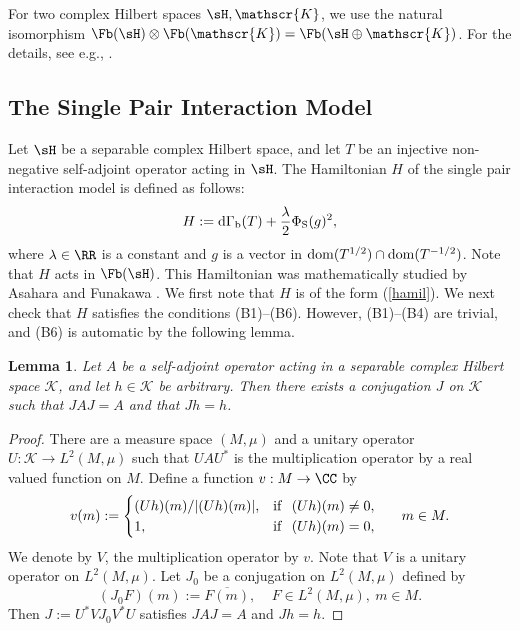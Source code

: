 \documentclass[12pt]{article}
\theoremstyle{plain}
\newtheorem{lem}[theorem]{\bf Lemma}
\numberwithin{equation}{section}
\theoremstyle{remark}
\begin{document}
For two complex Hilbert spaces $\sH,\mathscr{K}$, we use the natural isomorphism
$\Fb(\sH)\otimes\Fb(\mathscr{K})=\Fb(\sH\oplus\mathscr{K})$.
For the details, see e.g., \cite[Section 5.20]{A18}.








\subsection{The Single Pair Interaction Model}\label{pair interaction model}
Let $\sH$ be a separable complex Hilbert space, and let $T$ be an injective non-negative self-adjoint operator acting in $\sH$.
The Hamiltonian $H$ of the single pair interaction model is defined as follows:
\[
H:={\rm d}\Gamma_{\rm b}(T) + \frac{\lambda}{2}\Phi_{\rm S}(g)^2,
\] 
where $\lambda\in\RR$ is a constant and $g$ is a vector in ${\rm dom}(T^{1/2})\cap{\rm dom}(T^{-1/2})$.
Note that $H$ acts in $\Fb(\sH)$.
This Hamiltonian was mathematically studied by Asahara and Funakawa \cite{AF}.
We first note that $H$ is of the form (\ref{hamil}).
We next check that $H$ satisfies the conditions (B1)--(B6).
However, (B1)--(B4) are trivial, and (B6) is automatic by the following lemma.

\begin{lem}\label{conjugation lemma}
Let $A$ be a self-adjoint operator acting in a separable complex Hilbert space $\mathscr{K}$, and let $h\in\mathscr{K}$ be arbitrary.
Then there exists a conjugation $J$ on $\mathscr{K}$ such that $JAJ=A$ and that $Jh=h$.
\end{lem}

\begin{proof}
There are a measure space $(M,\mu)$ and a unitary operator $U:\mathscr{K}\to L^2(M,\mu)$ such that $UAU^*$ is the multiplication operator by a real valued function on $M$. 
Define a function $v:M\to\CC$ by
\[
  v(m) := \begin{cases}
    (Uh)(m)/|(Uh)(m)|, & {\rm if}\ \  (Uh)(m)\not=0, \\
    1, &  {\rm if}\ \ (Uh)(m)=0,
  \end{cases}\ \ \ \ \ m\in M.
\]
We denote by $V$, the multiplication operator by $v$.
Note that $V$ is a unitary operator on $L^2(M,\mu)$.
Let $J_0$ be a conjugation on $L^2(M,\mu)$ defined by
\[
(J_0F)(m) := \overline{F(m)},\ \ \ \ \ F\in L^2(M,\mu),\ m\in M.
\]
Then $J:=U^*VJ_0V^*U$ satisfies $JAJ=A$ and $Jh=h$.
\end{proof}
\end{document}
